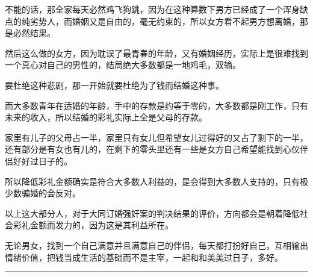 \documentclass[UTF8,11pt,oneside]{ctexart}
\begin{document}
不能的话，那全家每天必然鸡飞狗跳，因为在这种算数下男方已经成了一个浑身缺点的纯劣势人，而婚姻又是自由的，毫无约束的，所以女方看不起男方想离婚，那是必然结果。

然后这么做的女方，因为耽误了最青春的年龄，又有婚姻经历，实际上是很难找到一个真心对自己的男性的，结局绝大多数都是一地鸡毛，双输。

要杜绝这种悲剧，那一开始就要杜绝为了钱而结婚这种事。





而大多数青年在适婚的年龄，手中的存款是约等于零的，大多数都是刚工作，只有未来的收入，所以结婚的彩礼实际上全是父母的存款。

家里有儿子的父母占一半，家里只有女儿但希望女儿过得好的又占了剩下的一半，还有部分是有女也有儿的，在剩下的零头里还有一些是女方自己希望能找到心仪伴侣好好过日子的。

所以降低彩礼金额确实是符合大多数人利益的，是会得到大多数人支持的，只有极少数骗婚的会反对。

以上这大部分人，对于大同订婚强奸案的判决结果的评价，方向都会是朝着降低社会彩礼金额而发力的，因为这是其利益所在。

无论男女，找到一个自己满意并且满意自己的伴侣，每天都打扮好自己，互相输出情绪价值，把钱当成生活的基础而不是主宰，一起和和美美过日子，多好。



\rule{.9\linewidth}{1pt}

\end{document}

